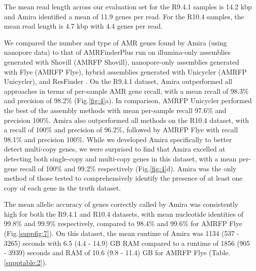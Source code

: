 The mean read length across our evaluation set for the R9.4.1 samples is 14.2 kbp and Amira identified a mean of 11.9 genes per read. For the R10.4 samples, the mean read length is 4.7 kbp with 4.4 genes per read.

We compared the number and type of AMR genes found by Amira (using nanopore data) to that of AMRFinderPlus run on illumina-only assemblies generated with Shovill \cite{Shovill, Bankevich2012} (AMRFP Shovill), nanopore-only assemblies generated with Flye \cite{Kolmogorov2019} (AMRFP Flye), hybrid assemblies generated with Unicycler \cite{Wick2017} (AMRFP Unicycler), and ResFinder \cite{Bortolaia2020}. On the R9.4.1 dataset, Amira outperformed all approaches in terms of per-sample AMR gene recall, with a mean recall of 98.3\% and precision of 98.2\% (Fig.\ref{fig:4}a). In comparison, AMRFP Unicycler performed the best of the assembly methods with mean per-sample recall 97.6\% and precision 100\%. Amira also outperformed all methods on the R10.4 dataset, with a recall of 100\% and precision of 96.2\%, followed by AMRFP Flye with recall 98.1\% and precision 100\%. While we developed Amira specifically to better detect multi-copy genes, we were surprised to find that Amira excelled at detecting both single-copy and multi-copy genes in this dataset, with a mean per-gene recall of 100\% and 99.2\% respectively (Fig.\ref{fig:4}d). Amira was the only method of those tested to comprehensively identify the presence of at least one copy of each gene in the truth dataset.

The mean allelic accuracy of genes correctly called by Amira was consistently high for both the R9.4.1 and R10.4 datasets, with mean nucleotide identities of 99.8\% and 99.9\% respectively, compared to 98.4\% and 99.6\% for AMRFP Flye (Fig.\ref{suppfig:7}). On this dataset, the mean runtime of Amira was 1134 (537 - 3265) seconds with 6.5 (4.4 - 14.9) GB RAM compared to a runtime of 1856 (905 - 3939) seconds and RAM of 10.6 (9.8 - 11.4) GB for AMRFP Flye (Table.\ref{supptable:2}). 

